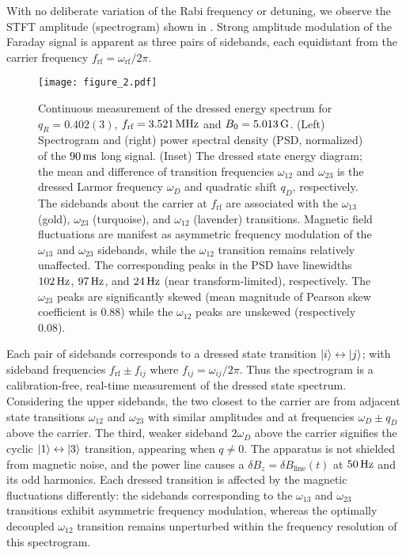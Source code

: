 \documentclass[aps,prl,reprint,superscriptaddress,floatfix]{revtex4-1}
\begin{document}
With no deliberate variation of the Rabi frequency or detuning, we observe the STFT amplitude (spectrogram) shown in .
Strong amplitude modulation of the Faraday signal is apparent as three pairs of sidebands, each equidistant from the carrier frequency $f_{\text{rf}} = \omega_{\text{rf}}/2\pi$. 
\begin{figure}
    \texttt{[image: figure\_2.pdf]}
    \caption{
    \label{fig:static_coupling}
    Continuous measurement of the dressed energy spectrum for $q_R = 0.402(3)$, $f_{\text{rf}}=\unit[3.521]{MHz}$ and $B_0=\unit[5.013]{G}$.
    (Left) Spectrogram and (right) power spectral density (PSD, normalized) of the $\unit[90]{ms}$ long signal. 
    (Inset) The dressed state energy diagram; the mean and difference of transition frequencies $\omega_{12}$ and $\omega_{23}$ is the dressed Larmor frequency $\omega_D$ and quadratic shift $q_D$, respectively.
    The sidebands about the carrier at $f_{\text{rf}}$ are associated with the $\omega_{13}$ (gold), $\omega_{23}$ (turquoise), and $\omega_{12}$ (lavender) transitions.
    Magnetic field fluctuations are manifest as asymmetric frequency modulation of the $\omega_{13}$ and $\omega_{23}$ sidebands, while the $\omega_{12}$ transition remains relatively unaffected.
    The corresponding peaks in the PSD have linewidths $\unit[102]{Hz}$, $\unit[97]{Hz}$, and $\unit[24]{Hz}$ (near transform-limited), respectively.
    The $\omega_{23}$ peaks are significantly skewed (mean magnitude of Pearson skew coefficient is $0.88$) while the $\omega_{12}$ peaks are unskewed (respectively $0.08$).
    }
\end{figure}
Each pair of sidebands corresponds to a dressed state transition $\vert i \rangle  \leftrightarrow \vert j \rangle $; with sideband frequencies  $f_{\text{rf}} \pm f_{ij}$ where $f_{ij} = \omega_{ij}/2\pi$.
Thus the spectrogram is a calibration-free, real-time measurement of the dressed state spectrum.
Considering the upper sidebands, the two closest to the carrier are from adjacent state transitions $\omega_{12}$ and $\omega_{23}$ with similar amplitudes and at frequencies $\omega_D \pm q_D$ above the carrier.
The third, weaker sideband $2\omega_D$ above the carrier signifies the cyclic $\vert 1 \rangle  \leftrightarrow \vert 3 \rangle $ transition, appearing when $q\neq 0$. 
The apparatus is not shielded from magnetic noise, and the power line causes a $\delta B_z = \delta B_{\text{line}}(t)$ at $\unit[50]{Hz}$ and its odd harmonics.
Each dressed transition is affected by the magnetic fluctuations differently: the sidebands corresponding to the $\omega_{13}$ and $\omega_{23}$ transitions exhibit asymmetric frequency modulation, whereas the optimally decoupled $\omega_{12}$ transition remains unperturbed within the frequency resolution of this spectrogram.
\end{document}
